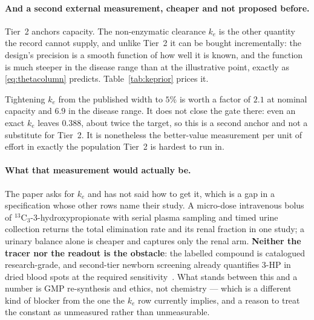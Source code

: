 \paragraph{And a second external measurement, cheaper and not proposed before.} Tier~2
anchors capacity. The non-enzymatic clearance $k_e$ is the other quantity the record
cannot supply, and unlike Tier~2 it can be bought incrementally: the design's precision is
a smooth function of how well it is known, and the function is much steeper in the disease
range than at the illustrative point, exactly as \eqref{eq:thetacolumn} predicts.
Table~\ref{tab:keprior} prices it.

\begin{table}[htbp]
\centering
\footnotesize
\caption{\label{tab:keprior}What tightening the prior on $k_e$ buys, at nominal capacity and in the disease range. The function is much steeper in the disease range, and even an exact $k_e$ does not close the gate there.}

\end{table}

Tightening $k_e$ from the published width to $5\%$ is worth a factor of $2.1$ at nominal
capacity and $6.9$ in the disease range. It does not close the gate there: even an exact
$k_e$ leaves $0.388$, about twice the target, so this is a second anchor and not a
substitute for Tier~2. It is nonetheless the better-value measurement per unit of effort
in exactly the population Tier~2 is hardest to run in.

\paragraph{What that measurement would actually be.} The paper asks for $k_e$ and has not
said how to get it, which is a gap in a specification whose other rows name their study. A
micro-dose intravenous bolus of $^{13}$C$_3$-3-hydroxypropionate with serial plasma
sampling and timed urine collection returns the total elimination rate and its renal
fraction in one study; a urinary balance alone is cheaper and captures only the renal arm.
\textbf{Neither the tracer nor the readout is the obstacle}: the labelled compound is
catalogued research-grade, and second-tier newborn screening already quantifies 3-HP in
dried blood spots at the required sensitivity~\cite{dbs_3hp_cutoff}. What stands between
this and a number is GMP re-synthesis and ethics, not chemistry --- which is a different
kind of blocker from the one the $k_e$ row currently implies, and a reason to treat the
constant as unmeasured rather than unmeasurable.

